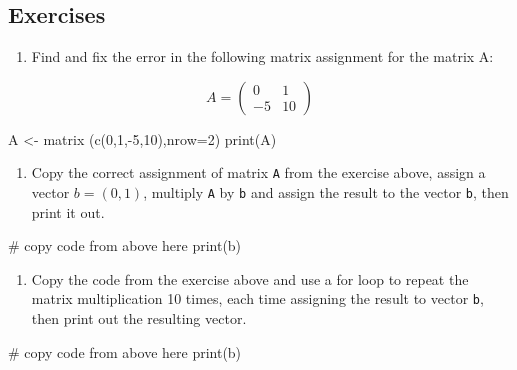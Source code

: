 \documentclass[
  letterpaper,
  DIV=11,
  numbers=noendperiod]{scrreprt}
\newenvironment{Shaded}{\begin{snugshade}}{\end{snugshade}}
\newcommand{\NormalTok}[1]{\textcolor[rgb]{0.00,0.23,0.31}{#1}}
\providecommand{\tightlist}{%
  \setlength{\itemsep}{0pt}\setlength{\parskip}{0pt}}\usepackage{longtable,booktabs,array}
\begin{document}
\hypertarget{exercises-36}{%
\subsection*{Exercises}\label{exercises-36}}

\begin{enumerate}
\def\labelenumi{\arabic{enumi}.}
\tightlist
\item
  Find and fix the error in the following matrix assignment for the
  matrix A:
\end{enumerate}

\[ 
A =  \left(\begin{array}{cc}0 & 1 \\ -5 & 10\end{array}\right)
\]

\begin{Shaded}
\begin{Highlighting}[]
\NormalTok{A \textless{}{-} matrix (c(0,1,{-}5,10),nrow=2)}
\NormalTok{print(A)}
\end{Highlighting}
\end{Shaded}

\begin{enumerate}
\def\labelenumi{\arabic{enumi}.}
\setcounter{enumi}{1}
\tightlist
\item
  Copy the correct assignment of matrix \texttt{A} from the exercise
  above, assign a vector \(b=(0,1)\), multiply \texttt{A} by \texttt{b}
  and assign the result to the vector \texttt{b}, then print it out.
\end{enumerate}

\begin{Shaded}
\begin{Highlighting}[]
\NormalTok{\# copy code from above here}
\NormalTok{print(b)}
\end{Highlighting}
\end{Shaded}

\begin{enumerate}
\def\labelenumi{\arabic{enumi}.}
\setcounter{enumi}{2}
\tightlist
\item
  Copy the code from the exercise above and use a for loop to repeat the
  matrix multiplication 10 times, each time assigning the result to
  vector \texttt{b}, then print out the resulting vector.
\end{enumerate}

\begin{Shaded}
\begin{Highlighting}[]
\NormalTok{\# copy code from above here}
\NormalTok{print(b)}
\end{Highlighting}
\end{Shaded}
\end{document}

